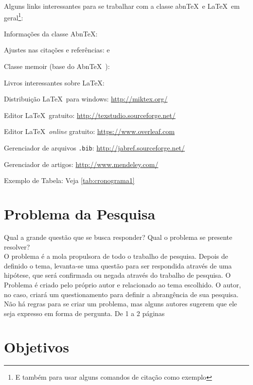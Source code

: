 \documentclass[
	12pt,				    %
	openright,			    %
	oneside,			    %
	a4paper,			    %
    sumario=tradicional,        %
	english,			    %
	brazil,				    %
 ]{abntex2}
\begin{document}
Alguns links interessantes para se trabalhar com a classe abn\TeX\ e \LaTeX\ em geral\footnote{E também para usar alguns comandos de citação como exemplo}:
\begin{alineas}
  \item Informações da classe Abn\TeX : 
  \item Ajustes nas citações e referências:  e 
  \item Classe memoir (base do Abn\TeX\ ): 
  \item Livros interessantes sobre \LaTeX: \cite{Dongen2012,LeslieLamport90,FrankMittelbach111,Dongen2012}
  \item Distribuição \LaTeX\ para windows: \url{http://miktex.org/}
  \item Editor \LaTeX\ gratuito: \url{http://texstudio.sourceforge.net/}
  \item Editor \LaTeX\ \textit{online} gratuito: \url{https://www.overleaf.com}
  \item Gerenciador de arquivos \texttt{.bib}: \url{http://jabref.sourceforge.net/}
  \item Gerenciador de artigos: \url{http://www.mendeley.com/}
  \item Exemplo de Tabela: Veja \autoref{tab:cronograma1}
\end{alineas}

\section{Problema da Pesquisa}\label{sec:ProbPesq}

Qual a grande questão que se busca responder? Qual o problema se presente resolver? \\
O problema é a mola propulsora de todo o trabalho de pesquisa. Depois de definido o tema, levanta-se uma questão para ser respondida através de uma hipótese, que será confirmada ou negada através do trabalho de pesquisa. O Problema é criado pelo próprio autor e relacionado ao tema escolhido. O autor, no caso, criará um questionamento para definir a abrangência de sua pesquisa. Não há regras para se criar um problema, mas alguns autores sugerem que ele seja expresso em forma de pergunta.
De 1 a 2 páginas

\section{Objetivos}\label{sec:objetivos}
\end{document}
